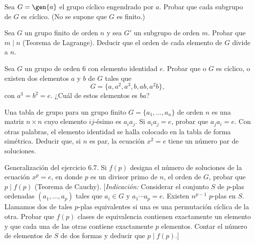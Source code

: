 \documentclass[12pt,a4paper]{book}
\begin{document}
    \begin{ejercicio}
        Sea $G=\gen{a}$ el grupo cíclico engendrado por $a$. Probar que cada subgrupo de
        $G$ es cíclico. (No se supone que $G$ es finito.)
    \end{ejercicio}

    \begin{ejercicio}
        Sea $G$ un grupo finito de orden $n$ y sea $G'$ un subgrupo de orden $m$. Probar
        que $m\mid n$ (Teorema de Lagrange). Deducir que el orden de cada elemento de $G$
        divide a $n$.
    \end{ejercicio}

    \begin{ejercicio}
        Sea $G$ un grupo de orden 6 con elemento identidad $e$. Probar que o $G$ es
        cíclico, o existen dos elementos $a$ y $b$ de $G$ tales que
        \begin{equation*}
            G=\{a,a^{2},a^{3},b,ab,a^{2}b\},
        \end{equation*}
        con $a^{3}=b^{2}=e$. ¿Cuál de estos elementos es $ba$?
    \end{ejercicio}

    \begin{ejercicio}
        Una tabla de grupo para un grupo finito $G=\{a_{1},\dots,a_{n}\}$ de orden $n$ es una
        matriz $n\times n$ cuyo elemento $ij$-ésimo es $a_{i}a_{j}$. Si $a_{i}a_{j}=e$, probar que
        $a_{j}a_{i}=e$. Con otras palabras, el elemento identidad se halla colocado en la tabla
        de forma simétrica. Deducir que, si $n$ es par, la ecuación $x^{2}=e$ tiene un número
        par de soluciones.
    \end{ejercicio}

    \begin{ejercicio}
        Generalización del ejercicio 6.7. Si $f(p)$ designa el número de soluciones de la
        ecuación $x^{p}=e$, en donde $p$ es un divisor primo de $n$, el orden de $G$, probar
        que $p\mid f(p)$ (Teorema de Cauchy). [\textit{Indicación:} Considerar el conjunto
        $S$ de $p$-plas ordenadas $(a_{1},\dots,a_{p})$ tales que $a_{i}\in G$ y
        $a_{1}\cdots a_{p}=e$. Existen $n^{p-1}$ $p$-plas en $S$. Llamamos dos de tales
        $p$-plas equivalentes si una es una permutación cíclica de la otra. Probar que
        $f(p)$ clases de equivalencia contienen exactamente un elemento y que cada una de
        las otras contiene exactamente $p$ elementos. Contar el número de elementos de $S$
        de dos formas y deducir que $p\mid f(p)$.]
    \end{ejercicio}
\end{document}
